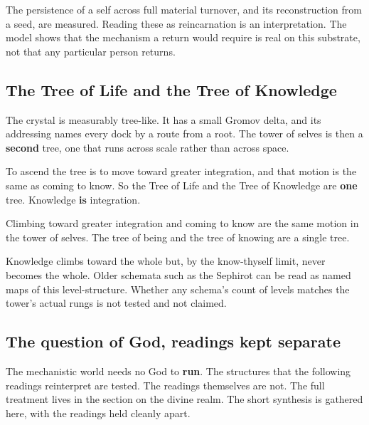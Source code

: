 \begin{result}
The persistence of a self across full material turnover, and its reconstruction from a seed, are measured. Reading these as reincarnation is an interpretation. The model shows that the mechanism a return would require is real on this substrate, not that any particular person returns.
\end{result}

\subsection{The Tree of Life and the Tree of Knowledge}

The crystal is measurably tree-like. It has a small Gromov delta, and its addressing names every dock by a route from a root. The tower of selves is then a \textbf{second} tree, one that runs across scale rather than across space.

To ascend the tree is to move toward greater integration, and that motion is the same as coming to know. So the Tree of Life and the Tree of Knowledge are \textbf{one} tree. Knowledge \textbf{is} integration.

\begin{principle}
Climbing toward greater integration and coming to know are the same motion in the tower of selves. The tree of being and the tree of knowing are a single tree.
\end{principle}

Knowledge climbs toward the whole but, by the know-thyself limit, never becomes the whole. Older schemata such as the Sephirot can be read as named maps of this level-structure. Whether any schema's count of levels matches the tower's actual rungs is not tested and not claimed.

\subsection{The question of God, readings kept separate}

The mechanistic world needs no God to \textbf{run}. The structures that the following readings reinterpret are tested. The readings themselves are not. The full treatment lives in the section on the divine realm. The short synthesis is gathered here, with the readings held cleanly apart.

